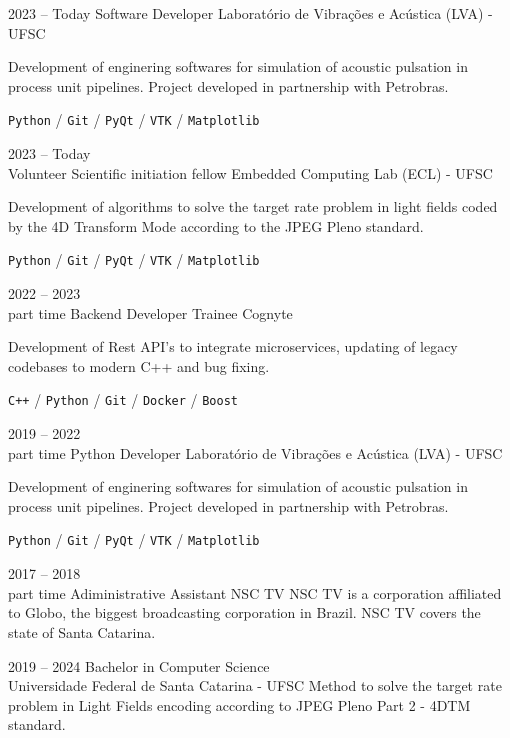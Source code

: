 \documentclass[11pt]{developercv} %
\begin{document}
\begin{entrylist}
	\entry
		{2023 -- Today}
		{Software Developer}
		{Laboratório de Vibrações e Acústica (LVA) - UFSC}
		{
			Development of enginering softwares for simulation of acoustic pulsation in process unit pipelines. Project developed in partnership with Petrobras.
			
			\texttt{Python} / \texttt{Git} / \texttt{PyQt} / \texttt{VTK} / \texttt{Matplotlib}
		}

	\entry
		{2023 -- Today \\ \footnotesize{Volunteer}}
		{Scientific initiation fellow}
		{Embedded Computing Lab (ECL) - UFSC}
		{
			Development of algorithms to solve the target rate problem in light fields coded by the 4D Transform Mode according to the JPEG Pleno standard.

			\texttt{Python} / \texttt{Git} / \texttt{PyQt} / \texttt{VTK} / \texttt{Matplotlib}
		}

	\entry
		{2022 -- 2023 \\ \footnotesize{part time}}
		{Backend Developer Trainee}
		{Cognyte}
		{
			Development of Rest API's to integrate microservices, updating of legacy codebases to modern C++ and bug fixing.
            
            \texttt{C++} / \texttt{Python} / \texttt{Git} / \texttt{Docker} / \texttt{Boost}
        }
	\entry
		{2019 -- 2022\\\footnotesize{part time}}
		{Python Developer}
		{Laboratório de Vibrações e Acústica (LVA) - UFSC}
		{
			Development of enginering softwares for simulation of acoustic pulsation in process unit pipelines. Project developed in partnership with Petrobras.
            
            \texttt{Python} / \texttt{Git} / \texttt{PyQt} / \texttt{VTK} / \texttt{Matplotlib}
        }
	\entry
		{2017 -- 2018 \\ \footnotesize{part time}}
		{Adiministrative Assistant}
		{NSC TV}
		{
            NSC TV is a corporation affiliated to Globo, the biggest broadcasting corporation in Brazil. NSC TV covers the state of Santa Catarina. 
        }
\end{entrylist}



\begin{entrylist}
	\entry
		{2019 -- 2024}
		{Bachelor in Computer Science}
		{\\Universidade Federal de Santa Catarina - UFSC}
		{
			Method to solve the target rate problem in Light Fields encoding according to JPEG Pleno Part 2 - 4DTM standard.
		}
\end{entrylist}
\end{document}
